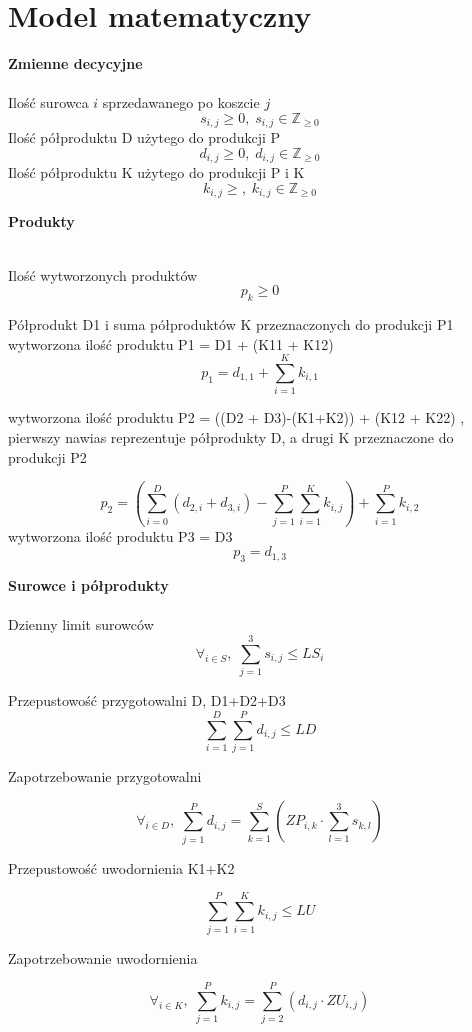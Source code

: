 \documentclass[a4paper, 10pt]{article}
\begin{document}
\section{Model matematyczny}



{\bf Zmienne decycyjne\\}
\hfill \\
Ilość surowca $i$ sprzedawanego po koszcie $j$
$$s_{i,j} \ge 0, \; s_{i,j} \in \mathbb Z_{\ge 0}$$ 
Ilość półproduktu D użytego do produkcji P
$$d_{i,j}  \ge 0,\; d_{i,j} \in \mathbb Z_{\ge 0}$$  
Ilość półproduktu K użytego do produkcji P i K
$$k_{i,j}  \ge ,\; k_{i,j} \in \mathbb Z_{\ge 0}$$  



{\bf Produkty\\}

\hfill \\ 
Ilość wytworzonych produktów
$$p_{k}  \ge 0$$ 

Półprodukt D1 i suma półproduktów K przeznaczonych do produkcji P1  wytworzona ilość produktu P1 = D1 + (K11 + K12) 
$$p_1 = d_{1,1} + \sum_{i=1}^{K} k_{i,1} $$  

wytworzona ilość produktu P2 = ((D2 + D3)-(K1+K2)) + (K12 + K22) , pierwszy nawias reprezentuje półprodukty D, 
a drugi K przeznaczone do produkcji P2

$$p_2 =  (\sum_{i=0}^{D} (d_{2,i} + d_{3,i}) -  \sum_{j=1}^{P}  \sum_{i=1}^{K} k_{i,j}) +   \sum_{i=1}^{P} k_{i,2}  $$ 
wytworzona ilość produktu P3 = D3
$$p_3 = d_{1,3} $$ 

{\bf Surowce i półprodukty\\}
\hfill \\ 

Dzienny limit surowców
$$\forall_{i \in S},\; \sum_{j=1}^{3}s_{i,j} \le  LS_i$$  

Przepustowość przygotowalni D, D1+D2+D3 
$$\sum_{i=1}^{D}\sum_{j=1}^{P}  d_{i,j} \le  LD$$

Zapotrzebowanie przygotowalni  

$$\forall_{i \in D},\; \sum_{j=1}^{P} d_{i,j} = \sum_{k=1}^{S} (ZP_{i,k} \cdot \sum_{l=1}^{3}s_{k,l}) $$ 

Przepustowość uwodornienia K1+K2

$$\sum_{j=1}^{P}  \sum_{i=1}^{K} k_{i,j} \le  LU$$

Zapotrzebowanie uwodornienia 


$$\forall_{i \in K},\; \sum_{j=1}^{P} k_{i,j} =  \sum_{j=2}^{P}  (d_{i,j} \cdot ZU_{i,j})$$ 
\end{document}
